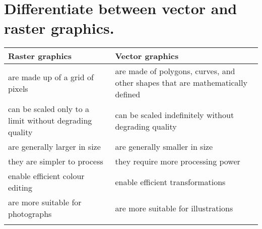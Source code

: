 \documentclass[a4paper,14pt,english,crop=false]{standalone}
\begin{document}
\section{Differentiate between vector and raster graphics.}
\begin{tabulary}{\textwidth}{L L}
  \centering
  Raster graphics & Vector graphics \\
  \midrule
  are made up of a grid of pixels &
  are made of polygons, curves, and other shapes that are mathematically
  defined \\
  can be scaled only to a limit without degrading quality &
  can be scaled indefinitely without degrading quality \\
  are generally larger in size & are generally smaller in size \\
  they are simpler to process & they require more processing power \\
  enable efficient colour editing & enable efficient transformations \\
  are more suitable for photographs & are more suitable for illustrations \\
   &
  
\end{tabulary}
\end{document}
